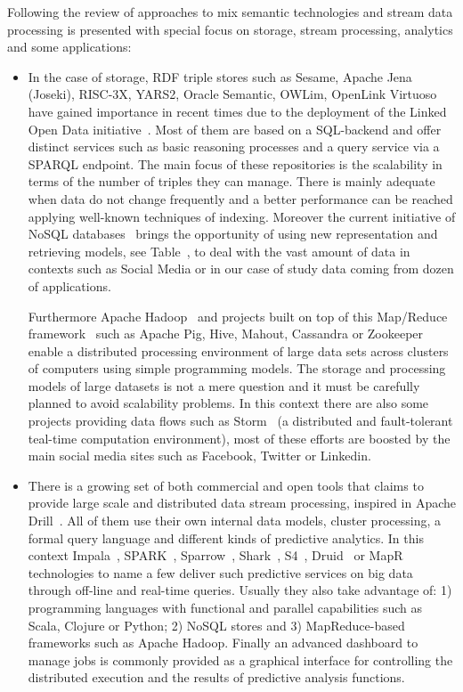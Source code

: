 Following the review of approaches to mix semantic technologies and stream data processing is 
presented with special focus on storage, stream processing, analytics and some applications:
\begin{itemize}
 \item In the case of storage, RDF triple stores such as Sesame, Apache Jena 
(Joseki), RISC-3X, YARS2, Oracle Semantic, OWLim, OpenLink Virtuoso have gained 
importance in recent times due to the deployment of the Linked Open Data 
initiative~\cite{Auer:2007:DNW:1785162.1785216}. Most of them are based on a SQL-backend and offer distinct 
services such as basic reasoning processes and a query service via a SPARQL 
endpoint. The main focus of these repositories is the scalability in terms of 
the number of triples they can manage. There is mainly adequate when data do not 
change frequently and a better performance can be reached applying well-known 
techniques of indexing. Moreover the current initiative of NoSQL databases~\cite{NoSQLdistilled} 
brings the opportunity of using new representation and retrieving models, see 
Table~\cite{nosql-db},  to deal with the vast amount of data in contexts such as Social Media 
or in our case of study data coming from dozen of applications.

Furthermore Apache Hadoop~\cite{perera2013mapreduce,owens2013mapreduce} and projects built on top of this Map/Reduce 
framework~\cite{Dean:2008:MSD:1327452.1327492} such as Apache Pig, Hive, Mahout, Cassandra or Zookeeper enable a 
distributed processing environment of large data sets across clusters of 
computers using simple programming models. The storage and processing models of 
large datasets is not a mere question and it must be carefully planned to avoid 
scalability problems. In this context there are also some projects providing 
data flows such as Storm~\cite{BigDataManing} (a distributed and fault-tolerant teal-time 
computation environment), most of these efforts are boosted by the main social 
media sites such as Facebook, Twitter or Linkedin. 

\item There is a growing set of both commercial and open tools that 
claims to provide large scale and distributed data stream processing, inspired in Apache Drill~\cite{hausenblas2013apache}. 
All of them use their own internal data models, cluster processing, a formal query language and different kinds of 
predictive analytics. In this context Impala~\cite{impala-project}, SPARK~\cite{zaharia2012discretized}, Sparrow~\cite{ousterhout2013sparrow},
Shark~\cite{DBLP:conf/sigmod/XinRZFSS13}, S4~\cite{neumeyer2010s4}, Druid~\cite{yangdruid} or MapR~\cite{mapr-project} technologies to name a 
few deliver such predictive services on big data through off-line and real-time queries. Usually they 
also take advantage of: 1) programming languages with functional and parallel capabilities such as Scala, Clojure or Python; 
2) NoSQL stores and 3) MapReduce-based frameworks such as Apache Hadoop. Finally an advanced dashboard to manage jobs is 
commonly provided as a graphical interface for controlling the distributed execution and the results of predictive 
analysis functions.



\end{itemize}
